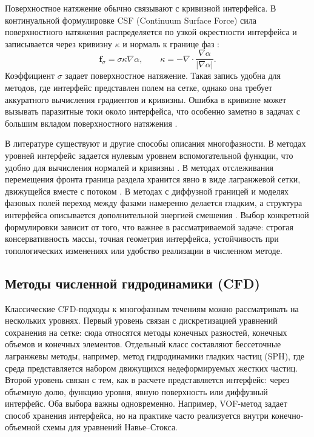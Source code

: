\documentclass[12pt,a4paper]{article}
\begin{document}
Поверхностное натяжение обычно связывают с кривизной интерфейса. В
континуальной формулировке CSF (Continuum Surface Force) сила поверхностного
натяжения распределяется по узкой окрестности интерфейса и записывается через
кривизну \(\kappa\) и нормаль к границе фаз \cite{Brackbill1992}:
\begin{equation}
    \mathbf{f}_{\sigma}
    =
    \sigma\kappa\nabla\alpha,
    \qquad
    \kappa=-\nabla\cdot
    \frac{\nabla\alpha}{|\nabla\alpha|}.
    \label{eq:review_csf}
\end{equation}
Коэффициент \(\sigma\) задает поверхностное натяжение. Такая запись удобна для
методов, где интерфейс представлен полем на сетке, однако она требует
аккуратного вычисления градиентов и кривизны. Ошибка в кривизне может вызывать
паразитные токи около интерфейса, что особенно заметно в задачах с большим
вкладом поверхностного натяжения \cite{Popinet2018}.

В литературе существуют и другие способы описания многофазности. В
методах уровней интерфейс задается нулевым уровнем вспомогательной функции,
что удобно для вычисления нормалей и кривизны \cite{Osher1988}. В
методах отслеживания перемещения фронта граница раздела хранится явно в виде лагранжевой сетки,
движущейся вместе с потоком \cite{Tryggvason2001}. В методах с диффузной границей и
моделях фазовых полей переход между фазами намеренно делается гладким, а
структура интерфейса описывается дополнительной энергией смешения
\cite{Anderson1998}. Выбор конкретной формулировки зависит от того, что важнее
в рассматриваемой задаче: строгая консервативность массы, точная геометрия
интерфейса, устойчивость при топологических изменениях или удобство реализации
в численном методе.

\subsection{Методы численной гидродинамики (CFD)}

Классические CFD-подходы к многофазным течениям можно рассматривать на
нескольких уровнях. Первый уровень связан с дискретизацией уравнений сохранения
на сетке: сюда относятся методы конечных разностей, конечных объемов и конечных
элементов. Отдельный класс составляют бессеточные лагранжевы методы, например, метод гидродинамики гладких частиц (SPH), где среда представляется набором движущихся недеформируемых жестких частиц. Второй уровень связан
с тем, как в расчете представляется интерфейс: через объемную долю,
функцию уровня, явную поверхность или диффузный интерфейс. Оба выбора важны
одновременно. Например, VOF-метод задает способ хранения интерфейса, но на
практике часто реализуется внутри конечно-объемной схемы для уравнений
Навье--Стокса.
\end{document}
